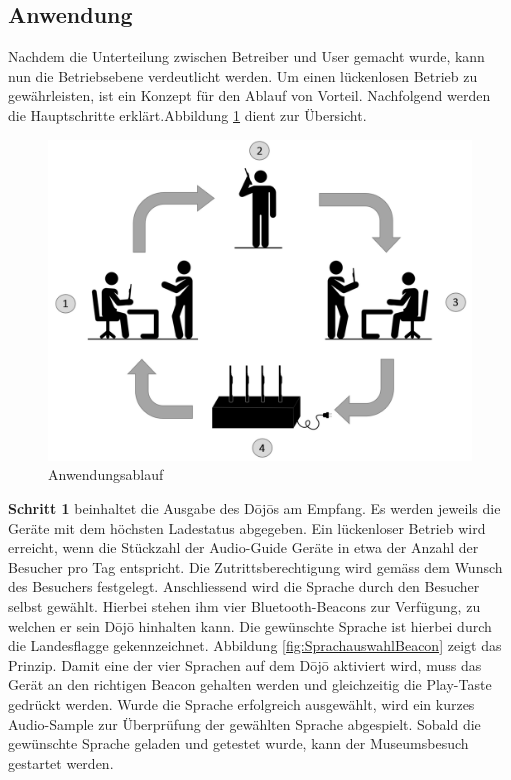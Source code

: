 \subsection{Anwendung}\label{sec:ladeablauf}
Nachdem die Unterteilung zwischen Betreiber und User gemacht wurde, kann nun die Betriebsebene verdeutlicht werden. Um einen lückenlosen Betrieb zu gewährleisten, ist ein Konzept für den Ablauf von Vorteil. Nachfolgend werden die Hauptschritte erklärt.Abbildung \ref{fig:Anwendungsablauf Dojo} dient zur Übersicht.

\begin{figure}[H]
	\begin{center}
		\includegraphics[width=120mm]{data/Ladezyklus.png}
		\caption[Anwendungsablauf des Dōjōs]{Anwendungsablauf} %
		\label{fig:Anwendungsablauf Dojo}
	\end{center}
\end{figure}

\textbf{Schritt 1} beinhaltet die Ausgabe des Dōjōs am Empfang. Es werden jeweils die Geräte mit dem höchsten Ladestatus abgegeben. Ein lückenloser Betrieb wird erreicht, wenn die Stückzahl der Audio-Guide Geräte in etwa der Anzahl der Besucher pro Tag entspricht. Die Zutrittsberechtigung wird gemäss dem Wunsch des Besuchers festgelegt. Anschliessend wird die Sprache durch den Besucher selbst gewählt. Hierbei stehen ihm vier Bluetooth-Beacons zur Verfügung, zu welchen er sein Dōjō hinhalten kann. Die gewünschte Sprache ist hierbei durch die Landesflagge gekennzeichnet. Abbildung \ref{fig:SprachauswahlBeacon} zeigt das Prinzip. Damit eine der vier Sprachen auf dem Dōjō aktiviert wird, muss das Gerät an den richtigen Beacon gehalten werden und gleichzeitig die Play-Taste gedrückt werden. Wurde die Sprache erfolgreich ausgewählt, wird ein kurzes Audio-Sample zur Überprüfung der gewählten Sprache abgespielt. Sobald die gewünschte Sprache geladen und getestet wurde, kann der Museumsbesuch gestartet werden.

